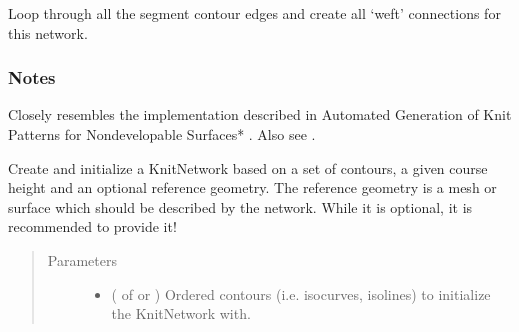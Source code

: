 \documentclass[letterpaper,10pt,english]{sphinxmanual}
\begin{document}
\begin{fulllineitems}
\begin{fulllineitems}
\end{fulllineitems}


\begin{fulllineitems}
\label{\detokenize{cockatoo:cockatoo.KnitNetwork.create_final_weft_connections}}
Loop through all the segment contour edges and create all ‘weft’
connections for this network.
\subsubsection*{Notes}

Closely resembles the implementation described in Automated Generation
of Knit Patterns for Non\sphinxhyphen{}developable Surfaces* \sphinxfootnotemark[1]. Also see  \sphinxfootnotemark[2].

\end{fulllineitems}


\begin{fulllineitems}
\label{\detokenize{cockatoo:cockatoo.KnitNetwork.create_from_contours}}
Create and initialize a KnitNetwork based on a set of contours, a
given course height and an optional reference geometry.
The reference geometry is a mesh or surface which should be described by the
network. While it is optional, it is  recommended to provide
it!
\begin{quote}\begin{description}
\item[{Parameters}] \leavevmode\begin{itemize}
\item {} 
 ( of  or ) \textendash{} Ordered contours (i.e. isocurves, isolines) to initialize the
KnitNetwork with.


\end{itemize}
\end{description}
\end{quote}
\end{fulllineitems}
\end{fulllineitems}
\end{document}
